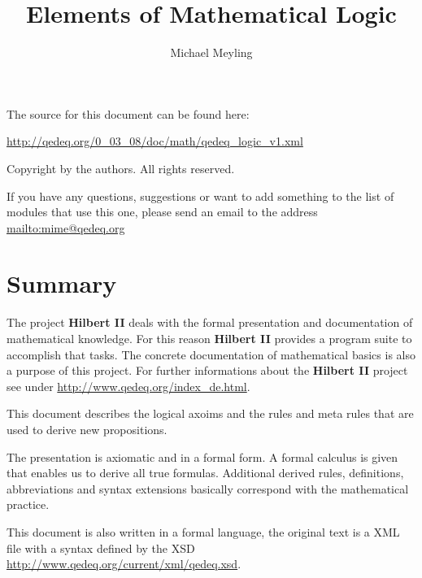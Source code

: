 \documentclass[a4paper,german,10pt,twoside]{book}
\title{Elements of Mathematical Logic}
\author{
Michael Meyling
}
\theoremstyle{definition}
\theoremstyle{remark}
\begin{document}
\maketitle

\setlength{\parskip}{5pt plus 2pt minus 1pt}
\mbox{}
\vfill

\par
The source for this document can be found here:
\par
\url{http://qedeq.org/0_03_08/doc/math/qedeq_logic_v1.xml}

\par
Copyright by the authors. All rights reserved.
\par
If you have any questions, suggestions or want to add something to the list of modules that use this one, please send an email to the address \url{mailto:mime@qedeq.org}

\setlength{\parskip}{0pt}
\tableofcontents

\setlength{\parskip}{5pt plus 2pt minus 1pt}

\chapter*{Summary} \label{chapter0} \hypertarget{chapter0}{}

The project \textbf{Hilbert II} deals with the formal presentation and documentation of mathematical knowledge. For this reason \textbf{Hilbert II} provides a program suite to accomplish that tasks. The concrete documentation of mathematical basics is also a purpose of this project.   
For further informations about the \textbf{Hilbert II} project see under \url{http://www.qedeq.org/index_de.html}.

\par
This document describes the logical axoims and the rules and meta rules that are used to derive new propositions.

\par
The presentation is axiomatic and in a formal form. A formal calculus is given that enables us to derive all true formulas. Additional derived rules, definitions, abbreviations and syntax extensions basically correspond with the mathematical practice.

\par
This document is also written in a formal language, the original text is a XML file with a syntax defined by the XSD \url{http://www.qedeq.org/current/xml/qedeq.xsd}.
\end{document}
